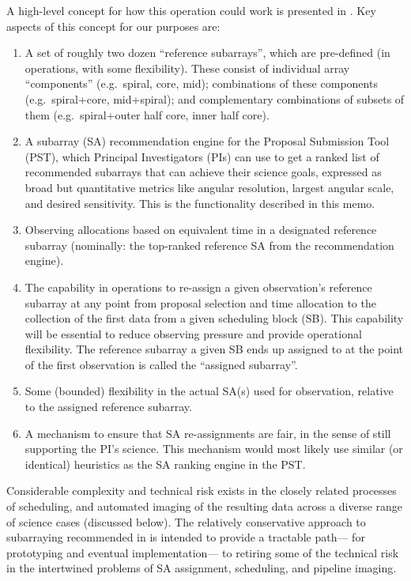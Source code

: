 \documentclass[11pt]{article}
\begin{document}
A high-level concept for how this operation could work is presented in
\citep{saNarrative}.  Key aspects of this concept for our purposes
are:
\begin{enumerate}
\item A set of roughly two dozen ``reference subarrays'', which are
  pre-defined (in operations, with some flexibility).  These consist
  of individual array ``components'' (e.g.\ spiral, core, mid);
  combinations of these components (e.g.\ spiral+core, mid+spiral);
  and complementary combinations of subsets of them (e.g.\
  spiral+outer half core, inner half core).
\item A subarray (SA) recommendation engine for the Proposal
  Submission Tool (PST), which Principal Investigators (PIs) can use
  to get a ranked list of recommended subarrays that can achieve their
  science goals, expressed as broad but quantitative metrics like
  angular resolution, largest angular scale, and desired sensitivity.
  This is the functionality described in this memo.
\item Observing allocations based on equivalent time in a designated reference
  subarray (nominally: the top-ranked reference SA from the recommendation
  engine).
\item The capability in operations to re-assign a given
  observation's reference subarray at any point from proposal
  selection and time allocation to the collection of the first data
  from a given scheduling block (SB).  This capability will be
  essential to reduce observing pressure and provide operational
  flexibility.  The reference subarray a given SB ends up assigned to
  at the point of the first observation is called the ``assigned
  subarray''.
\item Some (bounded) flexibility in the actual SA(s) used for
  observation, relative to the assigned reference subarray.
\item A mechanism to ensure that SA re-assignments are fair, in the
  sense of still supporting the PI's science.  This mechanism would
  most likely use similar (or identical) heuristics as the SA ranking
  engine in the PST.
\end{enumerate}
Considerable complexity and technical risk exists in the closely
related processes of scheduling, and automated imaging of the
resulting data across a diverse range of science cases (discussed
below).  The relatively conservative approach to subarraying
recommended in \citep{saNarrative} is intended to provide a tractable
path--- for prototyping and eventual implementation--- to retiring
some of the technical risk in the intertwined problems of SA
assignment, scheduling, and pipeline imaging.
\end{document}
